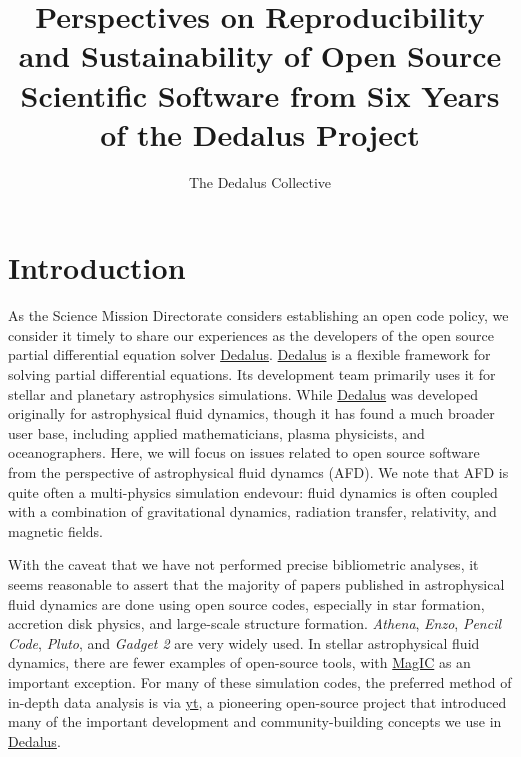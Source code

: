 \documentclass{paper}
\title{Perspectives on Reproducibility and Sustainability of Open Source Scientific Software from Six Years of the Dedalus Project}
\author{The Dedalus Collective}
\newcommand{\dedalus}{\href{http://dedalus-project.org}{Dedalus}}
\begin{document}
\maketitle

\section{Introduction}
\label{sec:intro}
As the Science Mission Directorate considers establishing an open code policy, we consider it timely to share our experiences as the developers of the open source partial differential equation solver \dedalus{}. \dedalus{} is a flexible framework for solving partial differential equations. Its development team primarily uses it for stellar and planetary astrophysics simulations. While \dedalus{} was developed originally for astrophysical fluid dynamics, though it has found a much broader user base, including applied mathematicians, plasma physicists, and oceanographers. Here, we will focus on issues related to open source software from the perspective of astrophysical fluid dynamcs (AFD). We note that AFD is quite often a multi-physics simulation endevour: fluid dynamics is often coupled with a combination of gravitational dynamics, radiation transfer, relativity, and magnetic fields. 

With the caveat that we have not performed precise bibliometric analyses, it seems reasonable to assert that the majority of papers published in astrophysical fluid dynamics are done using open source codes, especially in star formation, accretion disk physics, and large-scale structure formation. \emph{Athena}, \emph{Enzo}, \emph{Pencil Code}, \emph{Pluto}, and \emph{Gadget 2} are very widely used. In stellar astrophysical fluid dynamics, there are fewer examples of open-source tools, with \href{http://magic-sph.github.io}{MagIC} as an important exception. For many of these simulation codes, the preferred method of in-depth data analysis is via \href{http://yt-project.org}{yt}, a pioneering open-source project that introduced many of the important development and community-building concepts we use in \dedalus{}. 
\end{document}
